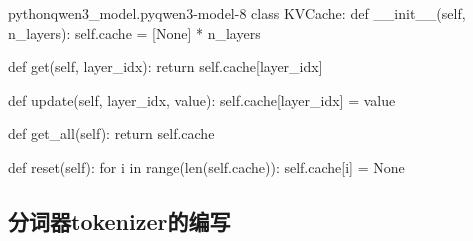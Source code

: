 \documentclass[lang=cn,newtx,10pt,scheme=chinese]{elegantbook}
\begin{document}
\begin{codebox}{python}{qwen3\_model.py}{qwen3-model-8}
class KVCache:
    def __init__(self, n_layers):
        self.cache = [None] * n_layers

    def get(self, layer_idx):
        return self.cache[layer_idx]

    def update(self, layer_idx, value):
        self.cache[layer_idx] = value

    def get_all(self):
        return self.cache

    def reset(self):
        for i in range(len(self.cache)):
            self.cache[i] = None
\end{codebox}

\subsection{分词器tokenizer的编写}
\end{document}
